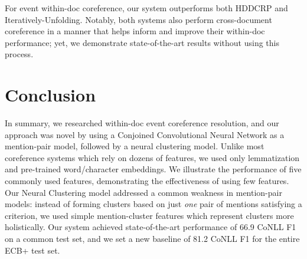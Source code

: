 \documentclass[11pt,a4paper]{article}
\begin{document}
For event within-doc coreference, our system outperforms both HDDCRP and Iteratively-Unfolding.  Notably, both systems also perform cross-document coreference in a manner that helps inform and improve their within-doc performance; yet, we demonstrate state-of-the-art results without using this process.

\section{Conclusion}
In summary, we researched within-doc event coreference resolution, and our approach was novel by using a Conjoined Convolutional Neural Network as a mention-pair model, followed by a neural clustering model.  Unlike most coreference systems which rely on dozens of features, we used only lemmatization and pre-trained word/character embeddings.  We illustrate the performance of five commonly used features, demonstrating the effectiveness of using few features.  Our Neural Clustering model addressed a common weakness in mention-pair models: instead of forming clusters based on just \textit{one} pair of mentions satisfying a criterion, we used simple mention-cluster features which represent clusters more holistically.  Our system achieved state-of-the-art performance of 66.9 CoNLL F1 on a common test set, and we set a new baseline of 81.2 CoNLL F1 for the entire ECB+ test set.   

%
%


\end{document}
